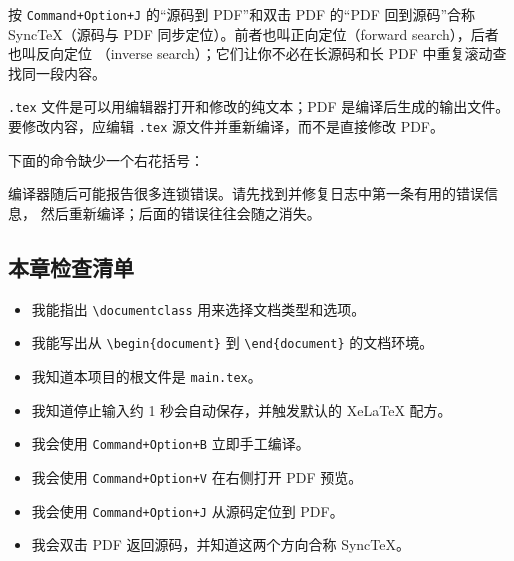 按 \texttt{Command+Option+J} 的“源码到 PDF”和双击 PDF 的“PDF 回到源码”合称
SyncTeX（源码与 PDF 同步定位）。前者也叫正向定位（forward search），后者也叫反向定位
（inverse search）；它们让你不必在长源码和长 PDF 中重复滚动查找同一段内容。

\begin{warningbox}
\texttt{.tex} 文件是可以用编辑器打开和修改的纯文本；PDF 是编译后生成的输出文件。
要修改内容，应编辑 \texttt{.tex} 源文件并重新编译，而不是直接修改 PDF。
\end{warningbox}

\begin{errorbox}
下面的命令缺少一个右花括号：
\begin{codeblock}
\textbf{这行少了右花括号
\end{codeblock}
编译器随后可能报告很多连锁错误。请先找到并修复日志中第一条有用的错误信息，
然后重新编译；后面的错误往往会随之消失。
\end{errorbox}

\subsection{本章检查清单}

\begin{itemize}[label={$\square$}]
    \item 我能指出 \texttt{\textbackslash documentclass} 用来选择文档类型和选项。
    \item 我能写出从 \texttt{\textbackslash begin\{document\}} 到 \texttt{\textbackslash end\{document\}} 的文档环境。
    \item 我知道本项目的根文件是 \texttt{main.tex}。
    \item 我知道停止输入约 1 秒会自动保存，并触发默认的 XeLaTeX 配方。
    \item 我会使用 \texttt{Command+Option+B} 立即手工编译。
    \item 我会使用 \texttt{Command+Option+V} 在右侧打开 PDF 预览。
    \item 我会使用 \texttt{Command+Option+J} 从源码定位到 PDF。
    \item 我会双击 PDF 返回源码，并知道这两个方向合称 SyncTeX。
\end{itemize}
